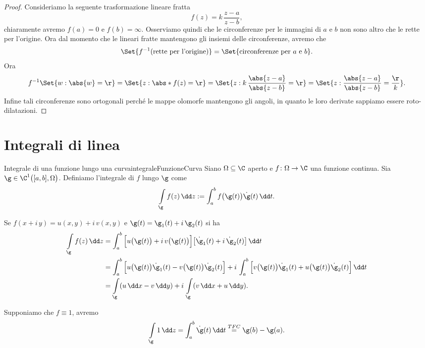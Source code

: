 \begin{proof}
	Consideriamo la seguente trasformazione lineare fratta
	\[
		f(z) = k \,\frac{z-a}{z-b},
	\]
	chiaramente avremo \(f(a)=0\) e \(f(b)=\infty\).
	Osserviamo quindi che le circonferenze per le immagini di \(a\) e \(b\) non sono altro che le rette per l'origine.
	Ora dal momento che le lineari fratte mantengono gli insiemi delle circonferenze, avremo che
	\[
		\Set{f^{-1}(\text{rette per l'origine})} = \Set{\text{circonferenze per \(a\) e \(b\)}}.
	\]
	Ora
	\[
		f^{-1}\Set{w:\abs{w}=\r} = \Set{z:\abs*{f(z)}=\r} = \Set{z: k\,\frac{\abs{z-a}}{\abs{z-b}}=\r} = \Set{z: \frac{\abs{z-a}}{\abs{z-b}}=\frac{\r}{k}}.
	\]
	Infine tali circonferenze sono ortogonali perché le mappe olomorfe mantengono gli angoli, in quanto le loro derivate sappiamo essere roto-dilatazioni.
\end{proof}
\section{Integrali di linea}

\begin{defn}{Integrale di una funzione lungo una curva}{integraleFunzioneCurva}
	Siano \(\Omega\subseteq\C\) aperto e \(f\colon \Omega \to \C\) una funzione continua.
	Sia \(\g\in\C^1\big([a,b],\Omega\big)\).
	Definiamo l'integrale di \(f\) lungo \(\g\) come
	\[
		\int\limits_\g f(z)\,\dd z := \int_a^b f\big(\g(t)\big)\dot{\g}(t)\,\dd t.
	\]
\end{defn}

\begin{oss}\label{similUnoForma}
	Se \(f(x+i\,y)=u(x,y)+i\,v(x,y)\) e \(\g(t)=\g_1(t)+i\,\g_2(t)\) si ha
	\[
		\begin{split}
			\int\limits_\g f(z)\,\dd z & = \int_a^b \Big[u\big(\g(t)\big)+i\,v\big(\g(t)\big)\Big]\big[\dot{\g}_1(t)+i\,\dot{\g}_2(t)\big]\,\dd t\\
			& = \int_a^b \Big[u\big(\g(t)\big)\dot{\g}_1(t)-v\big(\g(t)\big)\dot{\g}_2(t)\Big]+i\,\int_a^b \Big[v\big(\g(t)\big)\dot{\g}_1(t)+u\big(\g(t)\big)\dot{\g}_2(t)\Big]\,\dd t\\
			& = \int\limits_\g (u\,\dd x-v\,\dd y) + i\,\int\limits_\g (v\,\dd x + u\,\dd y).
		\end{split}
	\]
\end{oss}

\begin{ese}
	Supponiamo che \(f\equiv 1\), avremo
	\[
		\int\limits_\g 1\,\dd z = \int_a^b \dot{\g}(t)\,\dd t \overset{TFC}{=} \g(b)-\g(a).
	\]
\end{ese}

